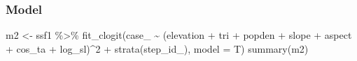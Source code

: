 \documentclass[
]{article}
\newenvironment{Shaded}{\begin{snugshade}}{\end{snugshade}}
\newcommand{\AttributeTok}[1]{\textcolor[rgb]{0.77,0.63,0.00}{#1}}
\newcommand{\DecValTok}[1]{\textcolor[rgb]{0.00,0.00,0.81}{#1}}
\newcommand{\FunctionTok}[1]{\textcolor[rgb]{0.00,0.00,0.00}{#1}}
\newcommand{\NormalTok}[1]{#1}
\newcommand{\OtherTok}[1]{\textcolor[rgb]{0.56,0.35,0.01}{#1}}
\newcommand{\SpecialCharTok}[1]{\textcolor[rgb]{0.00,0.00,0.00}{#1}}
\begin{document}
\hypertarget{model-1}{%
\subsubsection{Model}\label{model-1}}

\begin{Shaded}
\begin{Highlighting}[]
\NormalTok{m2 }\OtherTok{\textless{}{-}}\NormalTok{ ssf1 }\SpecialCharTok{\%\textgreater{}\%}
  \FunctionTok{fit\_clogit}\NormalTok{(case\_ }\SpecialCharTok{\textasciitilde{}}\NormalTok{ (elevation }\SpecialCharTok{+}\NormalTok{ tri }\SpecialCharTok{+}\NormalTok{ popden }\SpecialCharTok{+}\NormalTok{ slope }\SpecialCharTok{+}\NormalTok{ aspect }\SpecialCharTok{+}\NormalTok{ cos\_ta }\SpecialCharTok{+}\NormalTok{ log\_sl)}\SpecialCharTok{\^{}}\DecValTok{2} \SpecialCharTok{+} \FunctionTok{strata}\NormalTok{(step\_id\_), }\AttributeTok{model =}\NormalTok{ T)}
\FunctionTok{summary}\NormalTok{(m2)}
\end{Highlighting}
\end{Shaded}
\end{document}
